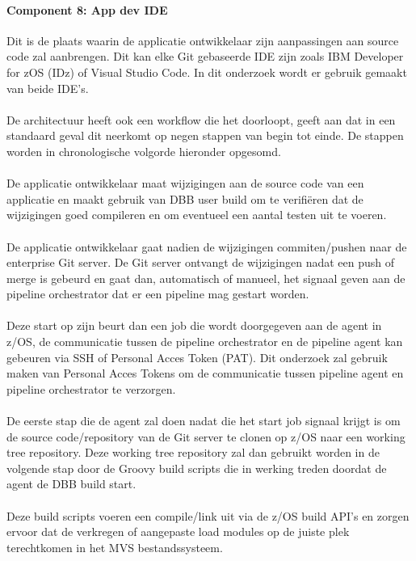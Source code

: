 \paragraph{Component 8: App dev IDE}
Dit is de plaats waarin de applicatie ontwikkelaar zijn aanpassingen aan source code zal aanbrengen. Dit kan elke Git gebaseerde IDE zijn zoals IBM Developer for zOS (IDz) of Visual Studio Code. In dit onderzoek wordt er gebruik gemaakt van beide IDE's.
\\ \\
De architectuur heeft ook een workflow die het doorloopt, \textcite{IBM2021a} geeft aan dat in een standaard geval dit neerkomt op negen stappen van begin tot einde. De stappen worden in chronologische volgorde hieronder opgesomd.
\\ \\
De applicatie ontwikkelaar maat wijzigingen aan de source code van een applicatie en maakt gebruik van DBB user build om te verifiëren dat de wijzigingen goed compileren en om eventueel een aantal testen uit te voeren.
\\ \\
De applicatie ontwikkelaar gaat nadien de wijzigingen commiten/pushen naar de enterprise Git server. De Git server ontvangt de wijzigingen nadat een push of merge is gebeurd en gaat dan, automatisch of manueel, het signaal geven aan de pipeline orchestrator dat er een pipeline mag gestart worden.
\\ \\
Deze start op zijn beurt dan een job die wordt doorgegeven aan de agent in z/OS, de communicatie tussen de pipeline orchestrator en de pipeline agent kan gebeuren via SSH of Personal Acces Token (PAT). Dit onderzoek zal gebruik maken van Personal Acces Tokens om de communicatie tussen pipeline agent en pipeline orchestrator te verzorgen.
\\ \\
De eerste stap die de agent zal doen nadat die het start job signaal krijgt is om de source code/repository van de Git server te clonen op z/OS naar een working tree repository. Deze working tree repository zal dan gebruikt worden in de volgende stap door de Groovy build scripts die in werking treden doordat de agent de DBB build start.
\\ \\
Deze build scripts voeren een compile/link uit via de z/OS build API's en zorgen ervoor dat de verkregen of aangepaste load modules op de juiste plek terechtkomen in het MVS bestandssysteem.
\\ \\
